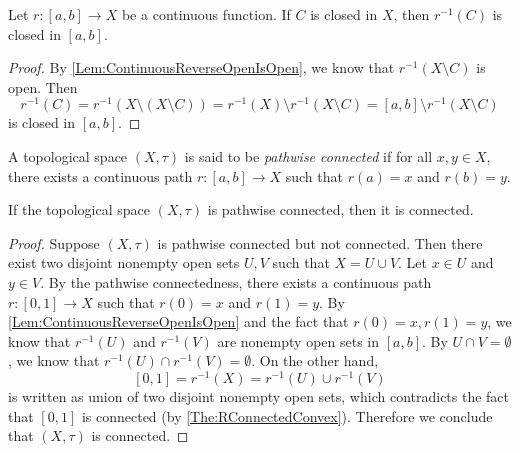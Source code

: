 \documentclass[screen,single]{techreport}
\numberwithin{equation}{section}
\begin{document}
\begin{proposition}\label{Prop:ContinuousReverseClosedIsClosed}
	Let $r : [a,b] \to X$ be a continuous function.
	If $C$ is closed in $X$, then $r^{-1}(C)$ is closed in $[a,b]$.
\end{proposition}
\begin{proof}
	By \cref{Lem:ContinuousReverseOpenIsOpen}, we know that $r^{-1}(X \setminus C)$ is open.
	Then
	\[
	r^{-1}(C) = r^{-1}(X \setminus (X \setminus C)) = r^{-1}(X) \setminus r^{-1}(X \setminus C) = [a,b] \setminus r^{-1}(X\setminus C)
	\]
	is closed in $[a,b]$.
\end{proof}

\begin{definition}\label{De:PathwiseConnected}
	A topological space $(X,\tau)$ is said to be \emph{pathwise connected} if for all $x,y \in X$, there exists a continuous path $r : [a,b] \to X$ such that $r(a) =x$ and $r(b)=y$.
\end{definition}

\begin{proposition}\label{Prop:PathWiseConnImplyConn}
	If the topological space $(X,\tau)$ is pathwise connected, then it is connected.
\end{proposition}
\begin{proof}
	Suppose $(X,\tau)$ is pathwise connected but not connected.
	Then there exist two disjoint nonempty open sets $U,V$ such that $X = U \cup V$.
	Let $x \in U$ and $y \in V$.
	By the pathwise connectedness, there exists a continuous path $r : [0,1] \to X$ such that $r(0)=x$ and $r(1)=y$.
	By \cref{Lem:ContinuousReverseOpenIsOpen} and the fact that $r(0)=x,r(1)=y$, we know that $r^{-1}(U)$ and $r^{-1}(V)$ are nonempty open sets in $[a,b]$.
	By $U \cap V = \emptyset$, we know that $r^{-1}(U) \cap r^{-1}(V) = \emptyset$.
	On the other hand,
	\[
	[0,1] = r^{-1}(X) = r^{-1}(U) \cup r^{-1}(V)
	\]
	is written as union of two disjoint nonempty open sets, which contradicts the fact that $[0,1]$ is connected (by \cref{The:RConnectedConvex}).
	Therefore we conclude that $(X,\tau)$ is connected.
\end{proof}
\end{document}
